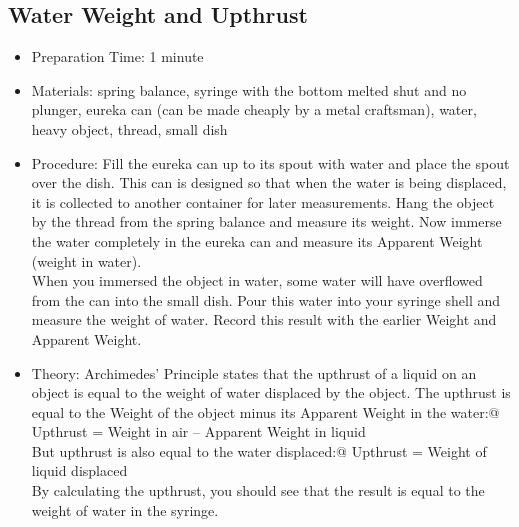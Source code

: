 \subsection{Water Weight and Upthrust}
\begin{itemize}
\item{Preparation Time: 1 minute}
\item{Materials: spring balance, syringe with the bottom melted shut and no plunger, eureka can (can be made cheaply by a metal craftsman), water, heavy object, thread, small dish}
\item{Procedure: Fill the eureka can up to its spout with water and place the spout over the dish. This can is designed so that when the water is being displaced, it is collected to another container for later measurements. Hang the object by the thread from the spring balance and measure its weight. Now immerse the water completely in the eureka can and measure its Apparent Weight (weight in water).\\
When you immersed the object in water, some water will have overflowed from the can into the small dish. Pour this water into your syringe shell and measure the weight of water. Record this result with the earlier Weight and Apparent Weight.}
\item{Theory: Archimedes’ Principle states that the upthrust of a liquid on an object is equal to the weight of water displaced by the object. The upthrust is equal to the Weight of the object minus its Apparent Weight in the water:@	Upthrust = Weight in air – Apparent Weight in liquid\\
But upthrust is also equal to the water displaced:@	Upthrust = Weight of liquid displaced\\
By calculating the upthrust, you should see that the result is equal to the weight of water in the syringe.}
\end{itemize}




